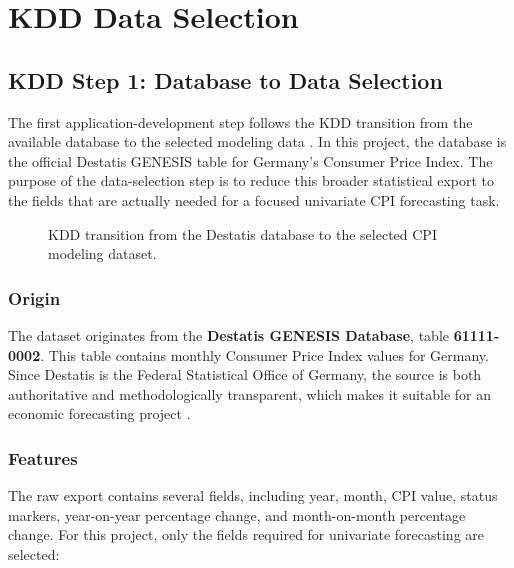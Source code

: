 %
%
%

\chapter{KDD Data Selection}
\label{ch:kdd-data-selection}

\section{KDD Step 1: Database to Data Selection}

The first application-development step follows the KDD transition from the available database to the selected modeling data \cite{Fayyad:1996}. In this project, the database is the official Destatis GENESIS table for Germany's Consumer Price Index. The purpose of the data-selection step is to reduce this broader statistical export to the fields that are actually needed for a focused univariate CPI forecasting task.

\begin{figure}[htbp]
	\centering
	
	\caption{KDD transition from the Destatis database to the selected CPI modeling dataset.}
	\label{fig:kdd-database-selection}
\end{figure}

\subsection{Origin}

The dataset originates from the \textbf{Destatis GENESIS Database}, table \textbf{61111-0002}. This table contains monthly Consumer Price Index values for Germany. Since Destatis is the Federal Statistical Office of Germany, the source is both authoritative and methodologically transparent, which makes it suitable for an economic forecasting project \cite{DestatisCPIQuality2023}.

\subsection{Features}

The raw export contains several fields, including year, month, CPI value, status markers, year-on-year percentage change, and month-on-month percentage change. For this project, only the fields required for univariate forecasting are selected:

